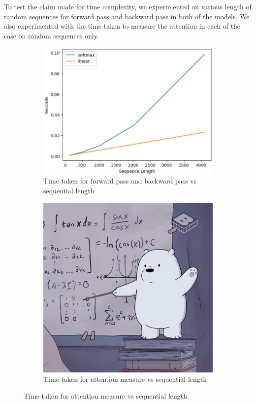 \documentclass{article}
\begin{document}
To test the claim made for time complexity, we experimented on various length of random sequences for forward pass and backward pass in both of the models. We also experimented with the time taken to measure the attention in each of the case on random sequences only.
\begin{figure}
    \begin{subfigure}{0.5\textwidth}
        \centering
        \includegraphics[scale=0.3]{images/forwardpassandbackwardpass.jpg}
        \caption{Time taken for forward pass and backward pass vs sequential length}
    \end{subfigure}
    \begin{subfigure}{0.5\textwidth}
        \centering
        \includegraphics[scale=0.25]{images/bhosdiwala.jpg}
        \caption{Time taken for attention measure vs sequential length}
    \end{subfigure}
\end{figure}
\end{document}
